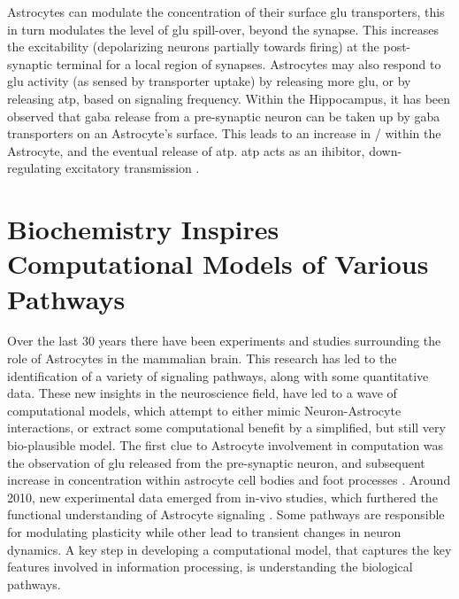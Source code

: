     Astrocytes can modulate the concentration of their surface glu transporters,
    this in turn modulates the level of glu spill-over, beyond the synapse. This
    increases the excitability (depolarizing neurons partially towards firing)
    at the post-synaptic terminal for a local region of synapses. Astrocytes may
    also respond to \Gls{glu} activity (as sensed by transporter uptake) by
    releasing more \Gls{glu}, or by releasing \Gls{atp}, based on signaling
    frequency. Within the Hippocampus, it has been observed that \Gls{gaba}
    release from a pre-synaptic neuron can be taken up by \Gls{gaba}
    transporters on an Astrocyte's surface. This leads to an increase in \na /
    \ca within the Astrocyte, and the eventual release of \Gls{atp}. \Gls{atp}
    acts as an ihibitor, down-regulating excitatory transmission
    \parencite{mederos_2018}.
        

    \section{Biochemistry Inspires Computational Models of Various Pathways}
    Over the last 30 years there have been experiments and studies surrounding the
    role of Astrocytes in the mammalian brain. This research has led to the
    identification of a variety of signaling pathways, along with some
    quantitative data. These new insights in the neuroscience field, have led
    to a wave of computational models, which attempt to either mimic
    Neuron-Astrocyte interactions, or extract some computational benefit by a
    simplified, but still very bio-plausible model. The first clue to Astrocyte
    involvement in computation was the observation of \Gls{glu} released from
    the pre-synaptic neuron, and subsequent increase in \ca concentration
    within astrocyte cell bodies and foot processes \parencite{manninen_2018}. Around
    2010, new experimental data emerged from in-vivo studies, which furthered
    the functional understanding of Astrocyte signaling
    \parencite{manninen_2018}. Some pathways are responsible for modulating
    plasticity while other lead to transient changes in neuron dynamics. A key
    step in developing a computational model, that captures the key features
    involved in information processing, is understanding the biological
    pathways.


